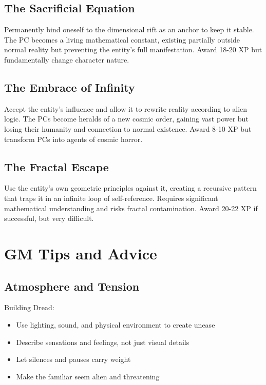 \documentclass[11pt]{article}
\begin{document}
\subsection{The Sacrificial Equation}

Permanently bind oneself to the dimensional rift as an anchor to keep it stable. The PC becomes a living mathematical constant, existing partially outside normal reality but preventing the entity's full manifestation. Award 18-20 XP but fundamentally change character nature.

\subsection{The Embrace of Infinity}

Accept the entity's influence and allow it to rewrite reality according to alien logic. The PCs become heralds of a new cosmic order, gaining vast power but losing their humanity and connection to normal existence. Award 8-10 XP but transform PCs into agents of cosmic horror.

\subsection{The Fractal Escape}

Use the entity's own geometric principles against it, creating a recursive pattern that traps it in an infinite loop of self-reference. Requires significant mathematical understanding and risks fractal contamination. Award 20-22 XP if successful, but very difficult.

\section{GM Tips and Advice}

\subsection{Atmosphere and Tension}

Building Dread:
\begin{itemize}
\item Use lighting, sound, and physical environment to create unease
\item Describe sensations and feelings, not just visual details
\item Let silences and pauses carry weight
\item Make the familiar seem alien and threatening
\end{itemize}
\end{document}
